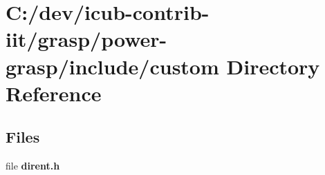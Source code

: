 \section{C\+:/dev/icub-\/contrib-\/iit/grasp/power-\/grasp/include/custom Directory Reference}
\label{dir_46bd45bc75c2916e437153cf58e10722}
\subsection*{Files}
\begin{DoxyCompactItemize}
\item 
file {\bfseries dirent.\+h}
\end{DoxyCompactItemize}
